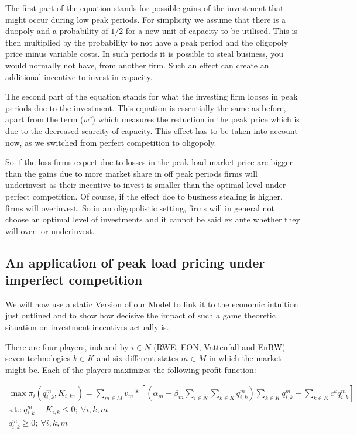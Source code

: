The first part of the equation stands for possible gains of the investment that might occur during low peak periods. For simplicity we assume that there is a duopoly and a probability of $1/2$ for a new unit of capacity to be utilised. This is then multiplied by the probability to not have a peak period and the oligopoly price minus variable costs. In such periods it is possible to steal business, you would normally not have, from another firm. Such an effect can create an additional incentive to invest in capacity. %

The second part of the equation stands for what the investing firm looses in peak periods due to the investment. This equation is essentially the same as before, apart from the term ($w^{\acute{c}}$) which measures the reduction in the peak price which is due to the decreased scarcity of capacity. This effect has to be taken into account now, as we switched from perfect competition to oligopoly.

So if the loss firms expect due to losses in the peak load market price are bigger than the gains due to more market share in off peak periods firms will underinvest as their incentive to invest is smaller than the optimal level under perfect competition. Of course, if the effect doe to business stealing is higher, firms will overinvest. So in an oligopolistic setting, firms will in general not choose an optimal level of investments and it cannot be said ex ante whether they will over- or underinvest.

\subsection{An application of peak load pricing under imperfect competition}

We will now use a static Version of our Model to link it to the economic intuition just outlined and to show how decisive the impact of such a game theoretic situation on investment incentives actually is.

There are four players, indexed by $i\in N$ (RWE, EON, Vattenfall and EnBW) seven technologies $k\in K$  and six different states $m\in M$ in which the market might be. Each of the players maximizes the following profit function:

\begin{gather}
	\max \pi_i(q_{i,k}^m,K_{i,k},)= \sum_{m\in M} v_m * \left[(\alpha_m-\beta_m\sum_{i\in N} \sum_{k\in K} q_{i,k}^m ) \sum_{k\in K} q_{i,k}^m - \sum_{k\in K} c^k q_{i,k}^m \right] \\
			\text{s.t.:} \  q_{i,k}^m-K_{i,k} \leq 0;\  \forall i,k,m \\  \nonumber
 										  q_{i,k}^m	\geq 0; \ \forall i,k,m   \nonumber
\end{gather}


